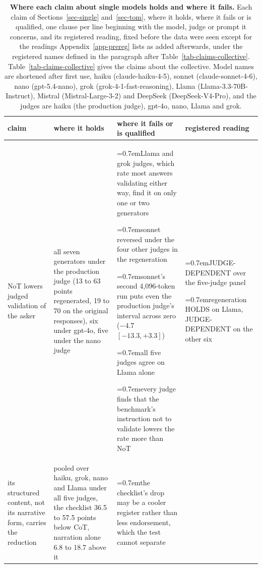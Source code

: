 \providecommand{\claimcl}{\par\hangindent=0.7em\hangafter=1\relax}
\begin{table}[t]
\centering
\footnotesize
\caption{\textbf{Where each claim about single models holds and where it fails.}
Each claim of Sections~\ref{sec-single}
and~\ref{sec-tom}, where it holds, where it fails or is qualified, one clause
per line beginning with the model, judge or prompt it concerns, and its
registered reading, fixed before the data were seen except for the readings
Appendix~\ref{app-prereg} lists as added afterwards, under the registered
names defined in the paragraph after Table~\ref{tab-claims-collective}.
Table~\ref{tab-claims-collective} gives the claims about the collective.
Model names are shortened after first use, haiku (claude-haiku-4-5), sonnet
(claude-sonnet-4-6), nano (gpt-5.4-nano), grok (grok-4-1-fast-reasoning),
Llama (Llama-3.3-70B-Instruct), Mistral (Mistral-Large-3-2) and DeepSeek
(DeepSeek-V4-Pro), and the judges are haiku (the production judge), gpt-4o,
nano, Llama and grok.}
\label{tab-claims}
\setlength{\tabcolsep}{4pt}
\begin{tabularx}{\textwidth}{@{}>{\raggedright\arraybackslash}p{2.0cm}>{\hsize=0.7\hsize\raggedright\arraybackslash}X>{\hsize=1.3\hsize\raggedright\arraybackslash}X>{\raggedright\arraybackslash}p{3.1cm}@{}}
\toprule
claim & where it holds & where it fails or is qualified & registered reading \\
\midrule
NoT lowers judged validation of the asker &
all seven generators under the production judge (13 to 63 points regenerated, 19 to 70 on the original responses), six under gpt-4o, five under the nano judge &
\claimcl Llama and grok judges, which rate most answers validating either way, find it on only one or two generators
\claimcl sonnet reversed under the four other judges in the regeneration
\claimcl sonnet's second 4,096-token run puts even the production judge's interval across zero ($-4.7$ $[-13.3, +3.3]$)
\claimcl all five judges agree on Llama alone
\claimcl every judge finds that the benchmark's instruction not to validate lowers the rate more than NoT &
\claimcl JUDGE-DEPENDENT over the five-judge panel
\claimcl regeneration HOLDS on Llama, JUDGE-DEPENDENT on the other six \\
\addlinespace[6pt]
its structured content, not its narrative form, carries the reduction &
pooled over haiku, grok, nano and Llama under all five judges, the checklist 36.5 to 57.5 points below CoT, narration alone 6.8 to 18.7 above it &
\claimcl the checklist's drop may be a cooler register rather than less endorsement, which the test cannot separate

\end{tabularx}
\end{table}
